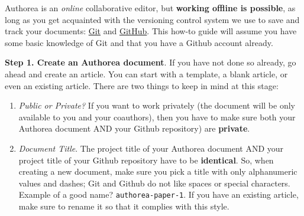 Authorea is an \textit{online} collaborative editor, but \textbf{working offline is possible}, as long as you get acquainted with the versioning control system we use to save and track your documents: \href{http://git-scm.com/}{Git} and \href{http://github.com/}{GitHub}. This how-to guide will assume you have some basic knowledge of Git and that you have a Github account already. 

\textbf{Step 1. Create an Authorea document}. If you have not done so already, go ahead and create an article. You can start with a template, a blank article, or even an existing article. There are two things to keep in mind at this stage:

\begin{enumerate}
\item \textit{Public or Private?} If you want to work privately (the document will be only available to you and your coauthors), then you have to make sure both your Authorea document AND your Github repository) are \textbf{private}.
\item \textit{Document Title}. The project title of your Authorea document AND your project title of your Github repository have to be \textbf{identical}. So, when creating a new document, make sure you pick a title with only alphanumeric values and dashes; Git and Github do not like spaces or special characters. Example of a good name? \verb|authorea-paper-1|. If you have an existing article, make sure to rename it so that it complies with this style.
\end{enumerate}
